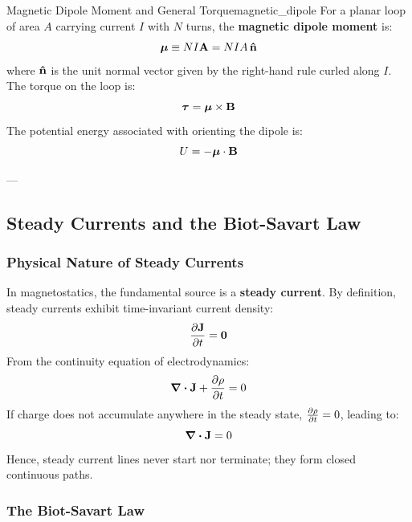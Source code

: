 \begin{definition}{Magnetic Dipole Moment and General Torque}{magnetic_dipole}
For a planar loop of area $A$ carrying current $I$ with $N$ turns, the \textbf{magnetic dipole moment} is:
\begin{equation}
    \bm{\mu} \equiv N I \vb{A} = N I A\,\vu{n}
    \label{eq:magnetic_dipole_def}
\end{equation}
where $\vu{n}$ is the unit normal vector given by the right-hand rule curled along $I$. The torque on the loop is:
\begin{equation}
    \bm{\tau} = \bm{\mu} \times \vb{B}
    \label{eq:torque_mu_cross_b}
\end{equation}
The potential energy associated with orienting the dipole is:
\begin{equation}
    U = -\bm{\mu} \cdot \vb{B}
\end{equation}
\end{definition}

---

\subsection{Steady Currents and the Biot-Savart Law}
\label{sec:biot_savart_law}

\subsubsection{Physical Nature of Steady Currents}

In magnetostatics, the fundamental source is a \textbf{steady current}. By definition, steady currents exhibit time-invariant current density:
\begin{equation}
    \pdv{\vb{J}}{t} = \vb{0}
\end{equation}
From the continuity equation of electrodynamics:
\begin{equation}
    \div\vb{J} + \pdv{\rho}{t} = 0
\end{equation}
If charge does not accumulate anywhere in the steady state, $\pdv{\rho}{t} = 0$, leading to:
\begin{equation}
    \div\vb{J} = 0
    \label{eq:continuity_steady}
\end{equation}
Hence, steady current lines never start nor terminate; they form closed continuous paths.

\subsubsection{The Biot-Savart Law}

